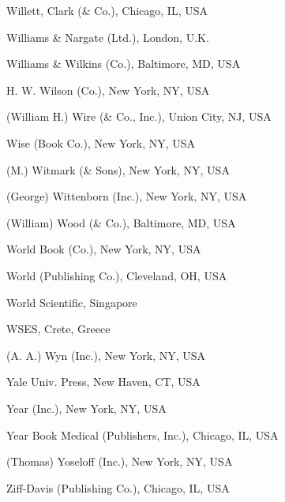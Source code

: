 \documentclass[10pt]{article}
\newcommand*{\abbrletter}[1]{\par\smallskip\noindent\colorbox{black!7}{\makebox[\dimexpr\columnwidth-2\fboxsep][l]{\textbf{\underline{#1}}}}\par}
\newcommand*{\pub}[1]{\noindent #1\par}
\let\publetter\abbrletter
\begin{document}
\pub{Willett, Clark (\& Co.), Chicago, IL, USA}
\pub{Williams \& Nargate (Ltd.), London, U.K.}
\pub{Williams \& Wilkins (Co.), Baltimore, MD, USA}
\pub{H. W. Wilson (Co.), New York, NY, USA}
\pub{(William H.) Wire (\& Co., Inc.), Union City, NJ, USA}
\pub{Wise (Book Co.), New York, NY, USA}
\pub{(M.) Witmark (\& Sons), New York, NY, USA}
\pub{(George) Wittenborn (Inc.), New York, NY, USA}
\pub{(William) Wood (\& Co.), Baltimore, MD, USA}
\pub{World Book (Co.), New York, NY, USA}
\pub{World (Publishing Co.), Cleveland, OH, USA}
\pub{World Scientific, Singapore}
\pub{WSES, Crete, Greece}
\pub{(A. A.) Wyn (Inc.), New York, NY, USA}
\publetter{Y}
\pub{Yale Univ. Press, New Haven, CT, USA}
\pub{Year (Inc.), New York, NY, USA}
\pub{Year Book Medical (Publishers, Inc.), Chicago, IL, USA}
\pub{(Thomas) Yoseloff (Inc.), New York, NY, USA}
\publetter{Z}
\pub{Ziff-Davis (Publishing Co.), Chicago, IL, USA}
\end{document}
